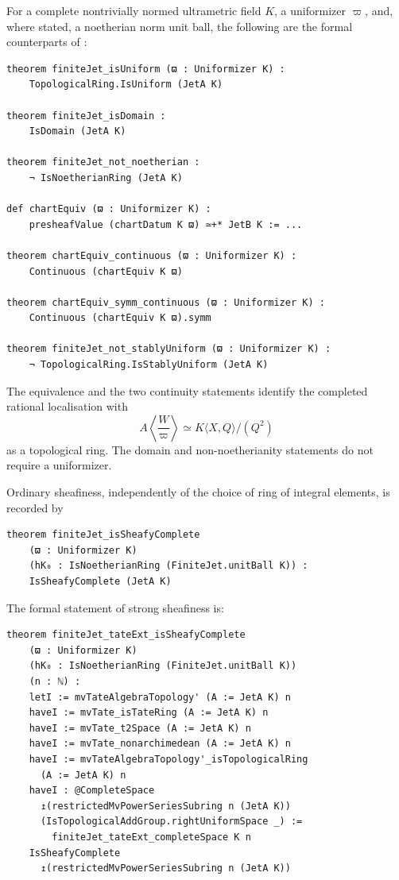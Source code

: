 \documentclass[11pt,reqno]{amsart}
\theoremstyle{definition}
\begin{document}
For a complete nontrivially normed ultrametric field \(K\), a uniformizer
\(\varpi\), and, where stated, a noetherian norm unit ball, the following are
the formal counterparts of
:

\begin{lstlisting}
theorem finiteJet_isUniform (ϖ : Uniformizer K) :
    TopologicalRing.IsUniform (JetA K)

theorem finiteJet_isDomain :
    IsDomain (JetA K)

theorem finiteJet_not_noetherian :
    ¬ IsNoetherianRing (JetA K)

def chartEquiv (ϖ : Uniformizer K) :
    presheafValue (chartDatum K ϖ) ≃+* JetB K := ...

theorem chartEquiv_continuous (ϖ : Uniformizer K) :
    Continuous (chartEquiv K ϖ)

theorem chartEquiv_symm_continuous (ϖ : Uniformizer K) :
    Continuous (chartEquiv K ϖ).symm

theorem finiteJet_not_stablyUniform (ϖ : Uniformizer K) :
    ¬ TopologicalRing.IsStablyUniform (JetA K)
\end{lstlisting}

The equivalence and the two continuity statements identify the completed
rational localisation with
\[
  A\left\langle\frac{W}{\varpi}\right\rangle
    \simeq K\langle X,Q\rangle/(Q^2)
\]
as a topological ring.  The domain and non-noetherianity statements do not
require a uniformizer.

Ordinary sheafiness, independently of the choice of ring of integral
elements, is recorded by

\begin{lstlisting}
theorem finiteJet_isSheafyComplete
    (ϖ : Uniformizer K)
    (hK₀ : IsNoetherianRing (FiniteJet.unitBall K)) :
    IsSheafyComplete (JetA K)
\end{lstlisting}

The formal statement of strong sheafiness is:

\begin{lstlisting}
theorem finiteJet_tateExt_isSheafyComplete
    (ϖ : Uniformizer K)
    (hK₀ : IsNoetherianRing (FiniteJet.unitBall K))
    (n : ℕ) :
    letI := mvTateAlgebraTopology' (A := JetA K) n
    haveI := mvTate_isTateRing (A := JetA K) n
    haveI := mvTate_t2Space (A := JetA K) n
    haveI := mvTate_nonarchimedean (A := JetA K) n
    haveI := mvTateAlgebraTopology'_isTopologicalRing
      (A := JetA K) n
    haveI : @CompleteSpace
      ↥(restrictedMvPowerSeriesSubring n (JetA K))
      (IsTopologicalAddGroup.rightUniformSpace _) :=
        finiteJet_tateExt_completeSpace K n
    IsSheafyComplete
      ↥(restrictedMvPowerSeriesSubring n (JetA K))
\end{lstlisting}
\end{document}
